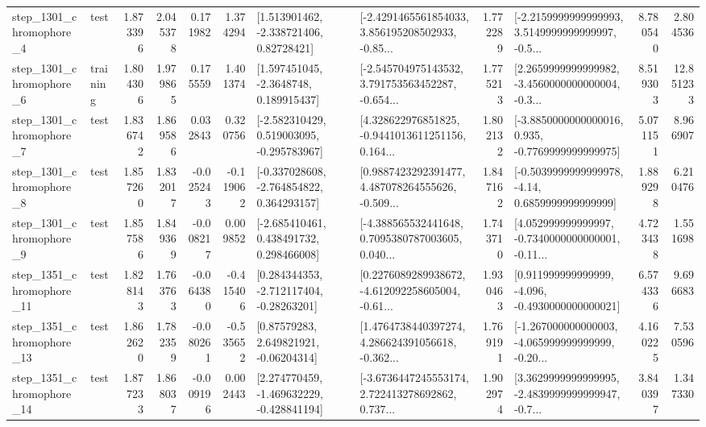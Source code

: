 \begin{tabular}{llrrrrllrlrr}
  step\_1301\_chromophore\_4 &      test &      1.873396 &    2.045378 &      0.171982 &  1.374294 &     [1.513901462, -2.338721406, 0.82728421] &  [-2.4291465561854033, 3.856195208502933, -0.85... &       1.772289 &  [-2.2159999999999993, 3.5149999999999997, -0.5... &            8.780540 &          2.804536 \\
  step\_1301\_chromophore\_6 &  training &      1.804306 &    1.979865 &      0.175559 &  1.401374 &      [1.597451045, -2.3648748, 0.189915437] &  [-2.545704975143532, 3.791753563452287, -0.654... &       1.775213 &  [2.2659999999999982, -3.4560000000000004, -0.3... &            8.519303 &         12.851233 \\
  step\_1301\_chromophore\_7 &      test &      1.836742 &    1.869586 &      0.032843 &  0.320756 &   [-2.582310429, 0.519003095, -0.295783967] &  [4.328622976851825, -0.9441013611251156, 0.164... &       1.802132 &  [-3.8850000000000016, 0.935, -0.7769999999999975] &            5.071151 &          8.966907 \\
  step\_1301\_chromophore\_8 &      test &      1.857260 &    1.832017 &     -0.025243 & -0.119062 &   [-0.337028608, -2.764854822, 0.364293157] &  [0.9887423292391477, 4.487078264555626, -0.509... &       1.847162 &   [-0.5039999999999978, -4.14, 0.6859999999999999] &            1.889298 &          6.210476 \\
  step\_1301\_chromophore\_9 &      test &      1.857586 &    1.849369 &     -0.008217 &  0.009852 &    [-2.685410461, 0.438491732, 0.298466008] &  [-4.388565532441648, 0.7095380787003605, 0.040... &       1.743710 &  [4.052999999999997, -0.7340000000000001, -0.11... &            4.723438 &          1.551698 \\
 step\_1351\_chromophore\_11 &      test &      1.828143 &    1.763763 &     -0.064380 & -0.415406 &    [0.284344353, -2.712117404, -0.28263201] &  [0.2276089289938672, -4.612092258605004, -0.61... &       1.930463 &   [0.911999999999999, -4.096, -0.4930000000000021] &            6.574336 &          9.696683 \\
 step\_1351\_chromophore\_13 &      test &      1.862620 &    1.782359 &     -0.080261 & -0.535652 &      [0.87579283, 2.649821921, -0.06204314] &  [1.4764738440397274, 4.286624391056618, -0.362... &       1.769191 &  [-1.267000000000003, -4.065999999999999, -0.20... &            4.160225 &          7.530596 \\
 step\_1351\_chromophore\_14 &      test &      1.877233 &    1.868037 &     -0.009196 &  0.002443 &   [2.274770459, -1.469632229, -0.428841194] &  [-3.6736447245553174, 2.722413278692862, 0.737... &       1.902974 &  [3.3629999999999995, -2.4839999999999947, -0.7... &            3.840397 &          1.347330 \\

\end{tabular}
